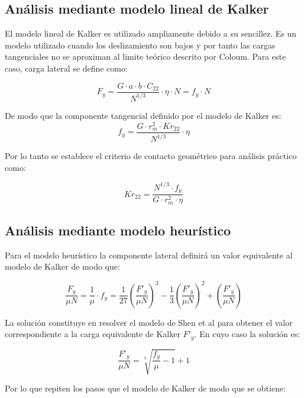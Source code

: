 \documentclass[main]{subfiles}
\begin{document}
\subsection{Análisis mediante modelo lineal de Kalker}

El modelo lineal de Kalker es utilizado ampliamente debido a su sencillez. Es un modelo utilizado cuando los deslizamiento son bajos y por tanto las cargas tangenciales no se aproximan al limite teórico descrito por Coloum. Para este caso, carga lateral se define como:

\begin{equation}
	F_y=\frac{G\cdot a \cdot b \cdot C_{22}}{N^{1/3}}\cdot \eta \cdot N=f_y\cdot N
\end{equation}

De modo que la componente tangencial definido por el modelo de Kalker es:
\begin{equation}
	f_y=\frac{G \cdot r_m^2 \cdot Kr_{22}}{N^{1/3}}\cdot \eta 
\end{equation}

Por lo tanto se establece el criterio de contacto geométrico para análisis práctico como:

\begin{equation}
	Kr_{22}=\frac{ N^{1/3} \cdot f_y}{G \cdot r_m^2 \cdot \eta}
\end{equation}

\subsection{Análisis mediante modelo heurístico}

Para el modelo heurístico la componente lateral definirá un valor equivalente al modelo de Kalker de modo que:

\begin{equation}
	\frac{F_y}{\mu N}=\frac{1}{\mu}\cdot f_y=
\frac{1}{27}\left( \frac{F'_y}{\mu N} \right)^3
-
\frac{1}{3}\left( \frac{F'_y}{\mu N} \right)^2
+
\left( \frac{F'_y}{\mu N} \right)
\end{equation}

La solución constituye en resolver el modelo de Shen et al para obtener el valor correspondiente a la carga equivalente de Kalker $F'_y$. En cuyo caso la solución es:

\begin{equation}
	\frac{F'_y}{\mu N}=\sqrt[3]{\frac{f_y}{\mu}-1}+1
\end{equation}

Por lo que repiten los pasos que el modelo de Kalker de modo que se obtiene:
\end{document}
